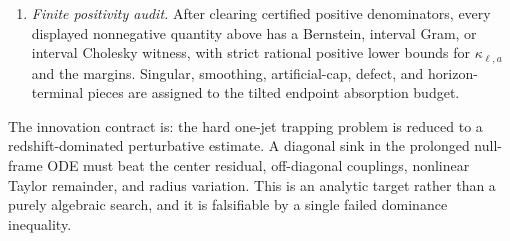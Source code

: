 \begin{definition}
\begin{enumerate}
    \item \emph{Finite positivity audit.}  After clearing certified positive
    denominators, every displayed nonnegative quantity above has a Bernstein,
    interval Gram, or interval Cholesky witness, with strict rational positive
    lower bounds for $\kappa_{\ell,a}$ and the margins.  Singular, smoothing,
    artificial-cap, defect, and horizon-terminal pieces are assigned to the
    tilted endpoint absorption budget.
\end{enumerate}
The innovation contract is: the hard one-jet trapping problem is reduced to a
redshift-dominated perturbative estimate.  A diagonal sink in the prolonged
null-frame ODE must beat the center residual, off-diagonal couplings, nonlinear
Taylor remainder, and radius variation.  This is an analytic target rather than
a purely algebraic search, and it is falsifiable by a single failed dominance
inequality.
\end{definition}

